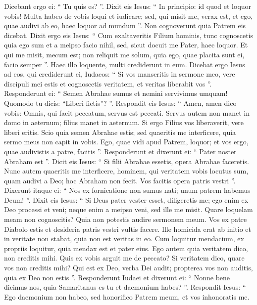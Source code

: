 \begin{biblechapter}
\begin{biblechapter}
\begin{biblechapter}
\begin{biblechapter}
\begin{biblechapter}
\begin{biblechapter}
\begin{biblechapter}
\begin{biblechapter}
\verse Dicebant ergo ei: “ Tu quis es? ”. Dixit eis Iesus: “ In principio: id quod et loquor vobis! 
\verse Multa habeo de vobis loqui et iudicare; sed, qui misit me, verax est, et ego, quae audivi ab eo, haec loquor ad mundum ”. 
\verse Non cognoverunt quia Patrem eis dicebat. 
\verse Dixit ergo eis Iesus: “ Cum exaltaveritis Filium hominis, tunc cognoscetis quia ego sum et a meipso facio nihil, sed, sicut docuit me Pater, haec loquor. 
\verse Et qui me misit, mecum est; non reliquit me solum, quia ego, quae placita sunt ei, facio semper ”. 
\verse Haec illo loquente, multi crediderunt in eum.
 \verse Dicebat ergo Iesus ad eos, qui crediderunt ei, Iudaeos: “ Si vos manseritis in sermone meo, vere discipuli mei estis 
\verse et cognoscetis veritatem, et veritas liberabit vos ”. 
\verse Responderunt ei: “ Semen Abrahae sumus et nemini servivimus umquam! Quomodo tu dicis: “Liberi fietis”? ”. 
\verse Respondit eis Iesus: “ Amen, amen dico vobis: Omnis, qui facit peccatum, servus est peccati. 
\verse Servus autem non manet in domo in aeternum; filius manet in aeternum. 
 \verse Si ergo Filius vos liberaverit, vere liberi eritis. 
\verse Scio quia semen Abrahae estis; sed quaeritis me interficere, quia sermo meus non capit in vobis. 
 \verse Ego, quae vidi apud Patrem, loquor; et vos ergo, quae audivistis a patre, facitis ”. 
\verse Responderunt et dixerunt ei: “ Pater noster Abraham est ”. Dicit eis Iesus: “ Si filii Abrahae essetis, opera Abrahae faceretis. 
\verse Nunc autem quaeritis me interficere, hominem, qui veritatem vobis locutus sum, quam audivi a Deo; hoc Abraham non fecit. 
\verse Vos facitis opera patris vestri ”. Dixerunt itaque ei: “ Nos ex fornicatione non sumus nati; unum patrem habemus Deum! ”. 
\verse Dixit eis Iesus: “ Si Deus pater vester esset, diligeretis me; ego enim ex Deo processi et veni; neque enim a meipso veni, sed ille me misit. 
\verse Quare loquelam meam non cognoscitis? Quia non potestis audire sermonem meum. 
 \verse Vos ex patre Diabolo estis et desideria patris vestri vultis facere. Ille homicida erat ab initio et in veritate non stabat, quia non est veritas in eo. Cum loquitur mendacium, ex propriis loquitur, quia mendax est et pater eius. 
 \verse Ego autem quia veritatem dico, non creditis mihi. 
\verse Quis ex vobis arguit me de peccato? Si veritatem dico, quare vos non creditis mihi? 
\verse Qui est ex Deo, verba Dei audit; propterea vos non auditis, quia ex Deo non estis ”.
 \verse Responderunt Iudaei et dixerunt ei: “ Nonne bene dicimus nos, quia Samaritanus es tu et daemonium habes? ”. 
\verse Respondit Iesus: “ Ego daemonium non habeo, sed honorifico Patrem meum, et vos inhonoratis me. 

\end{biblechapter}
\end{biblechapter}
\end{biblechapter}
\end{biblechapter}
\end{biblechapter}
\end{biblechapter}
\end{biblechapter}
\end{biblechapter}
